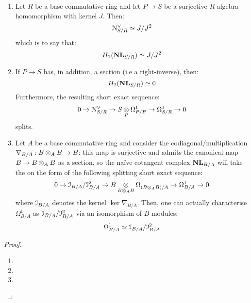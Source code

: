                 \begin{theorem} \label{theorem: computing_naive_cotangent_complexes}
                    \noindent
                    \begin{enumerate}
                        \item Let $R$ be a base commutative ring and let $P \to S$ be a surjective $R$-algebra homomorphism with kernel $J$. Then:
                            $$\mathcal{N}^{\vee}_{S/R} \simeq J/J^2$$
                        which is to say that:
                            $$H_1(\mathbf{NL}_{S/R}) \simeq J/J^2$$
                        \item If $P \to S$ has, in addition, a section (i.e a right-inverse), then:
                            $$H_2(\mathbf{NL}_{S/R}) \simeq 0$$
                        Furthermore, the resulting short exact sequence:
                            $$0 \to \calN^{\vee}_{S/R} \to S \tensor_P \Omega^1_{P/R} \to \Omega^1_{S/R} \to 0$$
                        splits.
                        \item Let $A$ be a base commutative ring and consider the codiagonal/multiplication $\nabla_{B/A}: B \tensor_A B \to B$: this map is surjective and admits the canonical map $B \to B \tensor_A B$ as a section, so the na\"ive cotangent complex $\mathbf{NL}_{B/A}$ will take the on the form of the following splitting short exact sequence:
                            $$0 \to \calI_{B/A}/\calI_{B/A}^2 \to B \tensor_{B \tensor_A B} \Omega^1_{(B \tensor_A B)/A} \to \Omega^1_{B/A} \to 0$$
                        where $\mathcal{I}_{B/A}$ denotes the kernel $\ker \nabla_{B/A}$. Then, one can actually characterise $\Omega^1_{B/A}$ as $\mathcal{I}_{B/A}/\mathcal{I}_{B/A}^2$ via an isomorphism of $B$-modules:
                            $$\Omega^1_{B/A} \simeq \mathcal{I}_{B/A}/\mathcal{I}_{B/A}^2$$
                    \end{enumerate}
                \end{theorem}
                    \begin{proof}
                        \noindent
                        \begin{enumerate}
                            \item 
                            \item 
                            \item 
                        \end{enumerate}
                    \end{proof}
